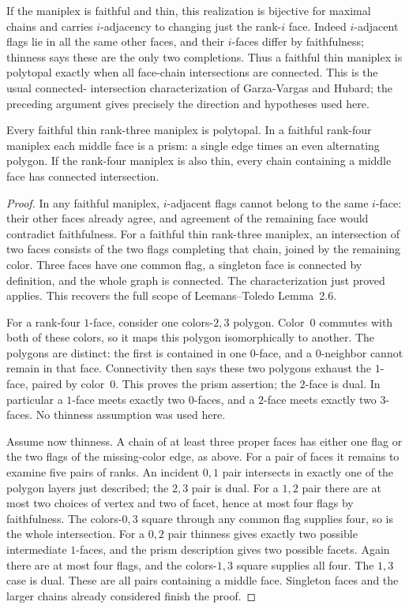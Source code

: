 \documentclass[a4paper,11pt]{article}
\begin{document}
If the maniplex is faithful and thin, this realization is bijective for
maximal chains and carries $i$-adjacency to changing just the rank-$i$ face.
Indeed $i$-adjacent flags lie in all the same other faces, and their
$i$-faces differ by faithfulness; thinness says these are the only two
completions. Thus a faithful thin maniplex is polytopal exactly when all
face-chain intersections are connected. This is the usual connected-
intersection characterization of Garza-Vargas and Hubard; the preceding
argument gives precisely the direction and hypotheses used here.

\begin{lemma}\label{smallrank}
Every faithful thin rank-three maniplex is polytopal. In a faithful
rank-four maniplex each middle face is a prism: a single edge times an
even alternating polygon. If the rank-four maniplex is also thin, every
chain containing a middle face has connected intersection.
\end{lemma}
\begin{proof}
In any faithful maniplex, $i$-adjacent flags cannot belong to the same
$i$-face: their other faces already agree, and agreement of the remaining
face would contradict faithfulness. For a faithful thin rank-three
maniplex, an intersection of two faces consists of the two flags
completing that chain, joined by the remaining color. Three faces have
one common flag, a singleton face is connected by definition, and the
whole graph is connected. The characterization just proved applies.
This recovers the full scope of Leemans--Toledo Lemma~2.6.

For a rank-four $1$-face, consider one colors-$2,3$ polygon. Color~0
commutes with both of these colors, so it maps this polygon isomorphically
to another. The polygons are distinct: the first is contained in one
$0$-face, and a $0$-neighbor cannot remain in that face. Connectivity
then says these two polygons exhaust the $1$-face, paired by color~0.
This proves the prism assertion; the $2$-face is dual. In particular a
$1$-face meets exactly two $0$-faces, and a $2$-face meets exactly two
$3$-faces. No thinness assumption was used here.

Assume now thinness. A chain of at least three proper faces has either
one flag or the two flags of the missing-color edge, as above. For a
pair of faces it remains to examine five pairs of ranks. An incident
$0,1$ pair intersects in exactly one of the polygon layers just described;
the $2,3$ pair is dual. For a $1,2$ pair there are at most two choices
of vertex and two of facet, hence at most four flags by faithfulness.
The colors-$0,3$ square through any common flag supplies four, so is the
whole intersection. For a $0,2$ pair thinness gives exactly two possible
intermediate $1$-faces, and the prism description gives two possible
facets. Again there are at most four flags, and the colors-$1,3$ square
supplies all four. The $1,3$ case is dual. These are all pairs containing
a middle face. Singleton faces and the larger chains already considered
finish the proof.
\end{proof}
\end{document}
